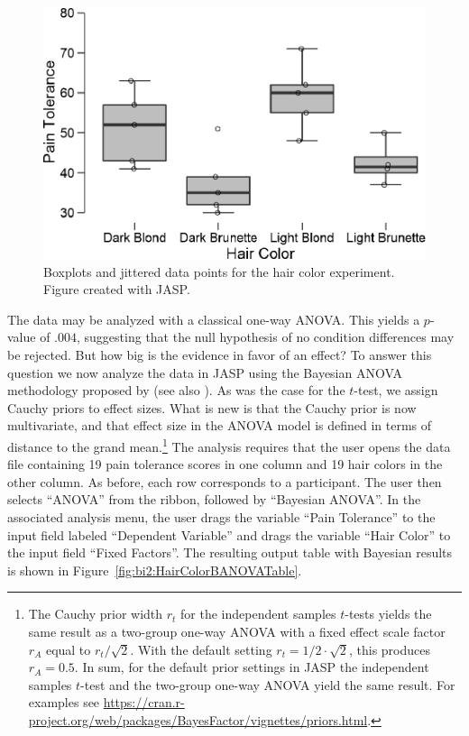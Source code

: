 \begin{figure}[tp]
    \begin{center}
        \includegraphics[width=.75\textwidth]{figs/bi2_HairColorBoxPlot.eps}
        \caption{Boxplots and jittered data points for the hair color experiment. Figure created with JASP.} \label{fig:bi2:HairColorBoxPlot}
    \end{center}
\end{figure}

The data may be analyzed with a classical one-way ANOVA. This yields a $p$-value of $.004$, suggesting that the null hypothesis of no condition differences may be rejected. But how big is the evidence in favor of an effect? To answer this question we now analyze the data in JASP using the Bayesian ANOVA methodology proposed by  (see also ). As was the case for the $t$-test, we assign Cauchy priors to effect sizes. What is new is that the Cauchy prior is now multivariate, and that effect size in the ANOVA model is defined in terms of distance to the grand mean.\footnote{The Cauchy prior width $r_t$ for the independent samples $t$-tests yields the same result as a two-group one-way ANOVA with a fixed effect scale factor $r_A$ equal to $r_t/\sqrt{2}$. With the default setting $r_t=1/2 \cdot \sqrt{2}$, this produces $r_A = 0.5$. In sum, for the default prior settings in JASP the independent samples $t$-test and the two-group one-way ANOVA yield the same result. For examples see \url{https://cran.r-project.org/web/packages/BayesFactor/vignettes/priors.html}.} The analysis requires that the user opens the data file containing 19 pain tolerance scores in one column and 19 hair colors in the other column. As before, each row corresponds to a participant. The user then selects ``ANOVA'' from the ribbon, followed by ``Bayesian ANOVA''. In the associated analysis menu, the user drags the variable ``Pain Tolerance'' to the input field labeled ``Dependent Variable'' and drags the variable ``Hair Color'' to the input field ``Fixed Factors''. The resulting output table with Bayesian results is shown in Figure~\ref{fig:bi2:HairColorBANOVATable}.

